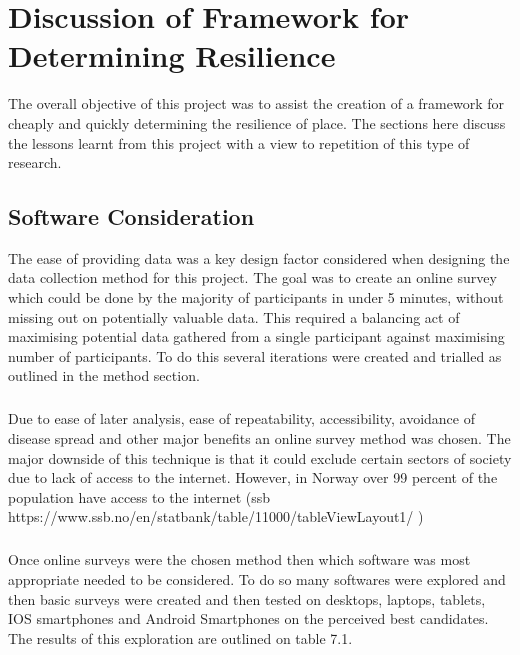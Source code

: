 
\chapter{Discussion of Framework for Determining Resilience}
The overall objective of this project was to assist the creation of a framework for cheaply and quickly determining the resilience of place. The sections here discuss the lessons learnt from this project with a view to repetition of this type of research.

\section{Software Consideration}
The ease of providing data was a key design factor considered when designing the data collection method for this project. The goal was to create an online survey which could be done by the majority of participants in under 5 minutes, without missing out on potentially valuable data. This required a balancing act of maximising potential data gathered from a single participant against maximising number of participants. To do this several iterations were created and trialled as outlined in the method section.
\paragraph{}
Due to ease of later analysis, ease of repeatability, accessibility,  avoidance of disease spread and other major benefits an online survey method was chosen. The major downside of this technique is that it could exclude certain sectors of society due to lack of access to the internet. However, in Norway over 99 percent of the population have access to the internet (ssb https://www.ssb.no/en/statbank/table/11000/tableViewLayout1/ ) 
\paragraph{}
Once online surveys were the chosen method then which software was most appropriate needed to be considered. To do so many softwares were explored and then basic surveys were created and then tested on desktops, laptops, tablets, IOS smartphones and Android Smartphones on the perceived best candidates. The results of this exploration are outlined on table 7.1.

